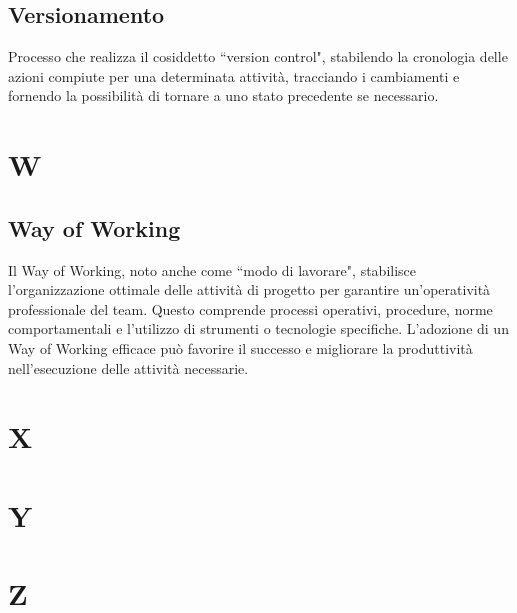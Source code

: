 \documentclass[8pt]{article}
\begin{document}
	\subsection*{Versionamento}
	Processo che realizza il cosiddetto ``version control", stabilendo la cronologia delle azioni compiute per una determinata attività, tracciando i cambiamenti e fornendo la possibilità di tornare a uno stato precedente se necessario.
	\newpage
	\section*{W}
	\subsection*{Way of Working}
	Il Way of Working, noto anche come ``modo di lavorare", stabilisce l'organizzazione ottimale delle attività di progetto per garantire un'operatività professionale del team. Questo comprende processi operativi, procedure, norme comportamentali e l'utilizzo di strumenti o tecnologie specifiche. L'adozione di un Way of Working efficace può favorire il successo e migliorare la produttività nell'esecuzione delle attività necessarie.
	\newpage
	\section*{X}
	
	\section*{Y}
	
	\section*{Z}
	
	
		
\end{document}
